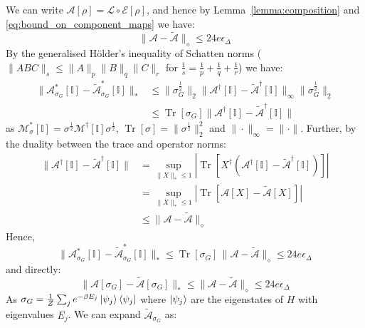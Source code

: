 \documentclass[aps,floatfix,10pt,amssymb,amsfont,amsmath,superscriptaddress,float,nofootinbib,longbibliography,nobalancelastpage,twocolumn]{revtex4-2}
\begin{document}
We can write $\mathcal{A}[\rho] = \mathcal{L} \circ \mathcal{E}[\rho]$, and hence by Lemma~\ref{lemma:composition} and \eqref{eq:bound_on_component_maps} we have:
\begin{equation}
    \|\mathcal{A} - \tilde{\mathcal{A}}\|_{\diamond} \leq 24e \epsilon_{\Delta}
\end{equation}
By the generalised H\"older's inequality of Schatten norms ($\|ABC\|_s \leq \|A\|_p\|B\|_q\|C\|_r$ for $\frac{1}{s} = \frac{1}{p}+ \frac{1}{q} + \frac{1}{r}$) we have:
\begin{align}
    \|\mathcal{A}^*_{\sigma_G}[\mathbb{I}] - \tilde{\mathcal{A}}^*_{\sigma_G}[\mathbb{I}]\|_* &\leq \|\sigma_G^{\frac{1}{2}}\|_2\|\mathcal{A}^{\dagger}[\mathbb{I}] - \tilde{\mathcal{A}}^{\dagger}[\mathbb{I}]\|_{\infty} \|\sigma_G^{\frac{1}{2}}\|_2\\
    &\leq \operatorname{Tr}[\sigma_G]\|\mathcal{A}^{\dagger}[\mathbb{I}] - \tilde{\mathcal{A}}^{\dagger}[\mathbb{I}]\|
\end{align}
as $\mathcal{M}^*_{\sigma}[\mathbb{I}] = \sigma^{\frac{1}{2}}\mathcal{M}^{\dagger}[\mathbb{I}]\sigma^{\frac{1}{2}}$, $\operatorname{Tr}[\sigma] = \|\sigma^{\frac{1}{2}}\|_2^2$ and $\|\cdot\|_{\infty}= \|\cdot\|$. Further, by the duality between the trace and operator norms: 
\begin{align}
    \|\mathcal{A}^{\dagger}[\mathbb{I}]- \tilde{\mathcal{A}}^{\dagger}[\mathbb{I}]\| &= \sup_{\|X\|_* \leq 1} |\operatorname{Tr}[X^{\dagger}(\mathcal{A}^{\dagger}[\mathbb{I}]- \tilde{\mathcal{A}}^{\dagger}[\mathbb{I}]) ]|\\
    &= \sup_{\|X\|_* \leq 1}|\operatorname{Tr}[\mathcal{A}[X]- \tilde{\mathcal{A}}[X] ]|\\
    &\leq \|\mathcal{A}- \tilde{\mathcal{A}}\|_{\diamond}
\end{align}
Hence,
\begin{equation}
    \|\mathcal{A}^*_{\sigma_G}[\mathbb{I}] - \tilde{\mathcal{A}}^*_{\sigma_G}[\mathbb{I}]\|_* \leq \operatorname{Tr}[\sigma_G]\,\|\mathcal{A}- \tilde{\mathcal{A}}\|_{\diamond} \leq 24e\epsilon_{\Delta}
    \label{eq:AAtildeclose1}
\end{equation}
and directly:
\begin{equation}
    \|\mathcal{A}[\sigma_G] - \tilde{\mathcal{A}}[\sigma_G]\|_* \leq \|\mathcal{A}-\tilde{\mathcal{A}}\|_{\diamond} \leq 24e\epsilon_{\Delta}
    \label{eq:AAtildeclose2}
\end{equation}
As $\sigma_G = \frac{1}{Z}\sum_j e^{-\beta E_j} \ket{\psi_j}\bra{\psi_j}$ where $\ket{\psi_j}$ are the eigenstates of $H$ with eigenvalues $E_j$. We can expand $\tilde{\mathcal{A}}_{\sigma_G}$ as:
\end{document}
